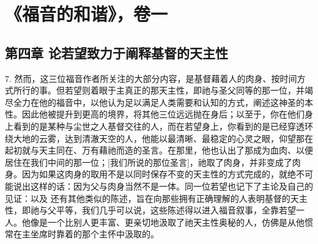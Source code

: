 

\section{《福音的和谐》，卷一}


\subsection{第四章 论若望致力于阐释基督的天主性}

7. 然而，这三位福音作者所关注的大部分内容，是基督藉着人的肉身、按时间方式所行的事。但若望则着眼于主真正的那天主性，即祂与圣父同等的那一位，并竭尽全力在他的福音中，以他认为足以满足人类需要和认知的方式，阐述这神圣的本性。因此他被提升到更高的境界，将其他三位远远抛在身后；以至于，你在他们身上看到的是某种与尘世之人基督交往的人，而在若望身上，你看到的是已经穿透环绕大地的云雾，达到清澈天空的人，他能以最清晰、最稳定的心灵之眼，仰望那在起初就与天主同在、万有藉祂而造的圣言。在那里，他也认出了那成为血肉、以便居住在我们中间的那一位；[我们所说的那位圣言]，祂取了肉身，并非变成了肉身。因为如果这肉身的取用不是以同时保存不变的天主性的方式完成的，就绝不可能说出这样的话：因为父与肉身当然不是一体。同一位若望也记下了主论及自己的见证：以及  还有其他类似的陈述，旨在向那些拥有正确理解的人表明基督的天主性，即祂与父平等，我们几乎可以说，这些陈述得以进入福音叙事，全靠若望一人。他像是一个比别人更丰富、更亲切地汲取了祂天主性奥秘的人，仿佛是从他惯常在主坐席时靠着的那个主怀中汲取的。\par



\section{}

